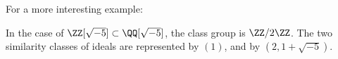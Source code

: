 

For a more interesting example:

\begin{lemma}
In the case of $\ZZ[\sqrt{-5}] \subset \QQ[\sqrt{-5}]$, the class group is $\ZZ/2\ZZ$. The two similarity classes of ideals are represented by $(1)$, and by $(2, 1 + \sqrt{-5})$. 
\end{lemma}

